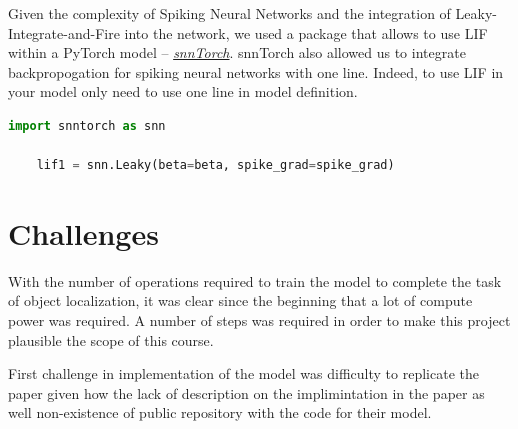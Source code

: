 \documentclass{article}
\begin{document}
Given the complexity of Spiking Neural Networks and the integration of Leaky-Integrate-and-Fire
into the network, we used a package that allows to use LIF within a PyTorch model -- 
\href{https://snntorch.readthedocs.io/en/latest/snntorch.html}{\textit{snnTorch}}. 
snnTorch also allowed us to integrate backpropogation for spiking neural networks
with one line. Indeed, to use LIF in your model only need to use one line in model
definition.

\begin{lstlisting}[language=Python, caption=Leaky-Integrate-and-Fire using snnTorch]
	import snntorch as snn

	lif1 = snn.Leaky(beta=beta, spike_grad=spike_grad)

\end{lstlisting}

\section{Challenges}

With the number of operations required to train the model to complete the task of object
localization, it was clear since the beginning that a lot of compute power was required. A number
of steps was required in order to make this project plausible the scope of this course.

First challenge in implementation of the model was difficulty to replicate the 
 paper given how the lack of description on the implimintation in the 
paper as well non-existence of public repository with the code for their model.


\newpage


\end{document}

